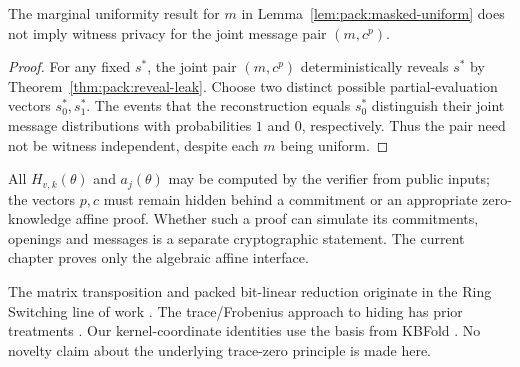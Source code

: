 \begin{corollary}\label{cor:pack:uniform-not-ZK}
The marginal uniformity result
for $m$ in Lemma~\ref{lem:pack:masked-uniform}
does not imply witness privacy for the
joint message pair $(m,c^p)$.
\end{corollary}
\begin{proof}
For any fixed $s^*$, the joint pair
$(m,c^p)$ deterministically reveals
$s^*$ by Theorem~\ref{thm:pack:reveal-leak}.
Choose two distinct possible
partial-evaluation vectors $s_0^*,s_1^*$.
The events that the reconstruction
equals $s_0^*$ distinguish their joint
message distributions with probabilities
$1$ and $0$, respectively.
Thus the pair need not be
witness independent, despite each
$m$ being uniform.
\end{proof}

\begin{remark}
All $H_{v,k}(\theta)$ and $a_j(\theta)$
may be computed by the verifier from
public inputs; the vectors $p,c$
must remain hidden behind a commitment
or an appropriate zero-knowledge
affine proof. Whether such a proof can
simulate its commitments, openings and
messages is a separate cryptographic
statement. The current chapter proves
only the algebraic affine interface.
\end{remark}

\begin{remark}
The matrix transposition and packed
bit-linear reduction originate in the
Ring Switching line of work
\cite{DiamondPosen2024}.
The trace/Frobenius approach to hiding
has prior treatments
\cite{Kochergin2026,FrigoShelat2026}.
Our kernel-coordinate identities use
the basis from KBFold
\cite{MkhidaKBFold2026}.
No novelty claim about the
underlying trace-zero principle is
made here.
\end{remark}
